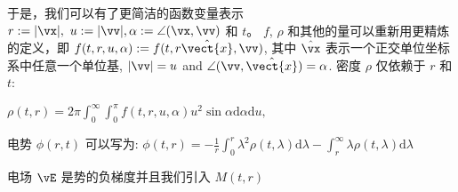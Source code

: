 
于是，我们可以有了更简洁的函数变量表示 $r:=|\vx|,~ u:=|\vv|,\alpha:=\angle(\vx,\vv)$ 和 $t$。 $f$, $\rho$ 和其他的量可以重新用更精炼的定义，即 $f(t,r,u,\alpha) := f(t, r\hat{\vect{x}} , \vv)$, 其中 $\hat{\vx}$ 表示一个正交单位坐标系中任意一个单位基, $|\vv| = u$ and $ \angle(\vv, \hat{\vect{x}})=\alpha$. 密度 $\rho$ 仅依赖于 $r$ 和 $t$: 

$
\rho( t,r)=2 \pi \int_{0}^{\infty} \int_{0}^{\pi} f(t, r, u, \alpha) u^{2} \sin \alpha \mathrm{d} \alpha  \mathrm{d} u,$

电势 $\phi(r,t)$ 可以写为: 
    $
    \phi(t, r)=-\frac{1}{r} \int_{0}^{r} \lambda^{2} \rho(t, \lambda)  \mathrm{d} \lambda-\int_{r}^{\infty} \lambda \rho(t, \lambda)  \mathrm{d} \lambda
    $
 
电场 $\vE$ 是势的负梯度并且我们引入 $M(t, r)$ %

